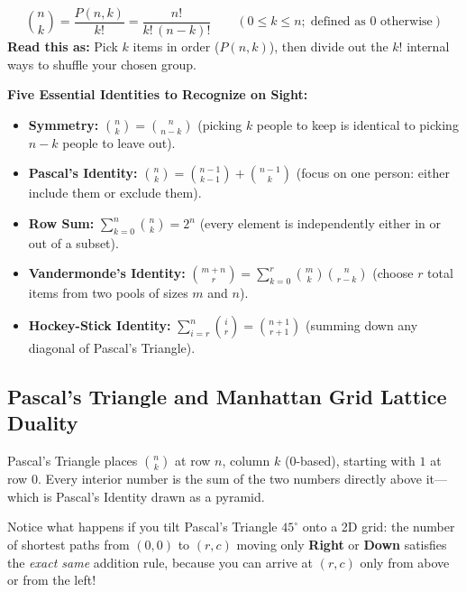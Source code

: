 \documentclass[11pt,a4paper]{article}
\theoremstyle{definition}
\begin{document}
\begin{formulabox}
\[
    \binom{n}{k} = \frac{P(n, k)}{k!} = \frac{n!}{k!\,(n - k)!}
    \qquad (0 \le k \le n;\; \text{defined as } 0 \text{ otherwise})
\]
\textbf{Read this as:} Pick $k$ items in order ($P(n, k)$), then divide out the $k!$ internal ways to shuffle your chosen group.
\end{formulabox}

\noindent\textbf{Five Essential Identities to Recognize on Sight:}
\begin{itemize}
    \item \textbf{Symmetry:} $\binom{n}{k} = \binom{n}{n-k}$ (picking $k$ people to keep is identical to picking $n - k$ people to leave out).
    \item \textbf{Pascal's Identity:} $\binom{n}{k} = \binom{n-1}{k-1} + \binom{n-1}{k}$ (focus on one person: either include them or exclude them).
    \item \textbf{Row Sum:} $\sum_{k=0}^{n} \binom{n}{k} = 2^n$ (every element is independently either in or out of a subset).
    \item \textbf{Vandermonde's Identity:} $\binom{m+n}{r} = \sum_{k=0}^{r} \binom{m}{k}\binom{n}{r-k}$ (choose $r$ total items from two pools of sizes $m$ and $n$).
    \item \textbf{Hockey-Stick Identity:} $\sum_{i=r}^{n} \binom{i}{r} = \binom{n+1}{r+1}$ (summing down any diagonal of Pascal's Triangle).
\end{itemize}

\subsection{Pascal's Triangle and Manhattan Grid Lattice Duality}

Pascal's Triangle places $\binom{n}{k}$ at row $n$, column $k$ ($0$-based), starting with $1$ at row $0$. Every interior number is the sum of the two numbers directly above it---which is Pascal's Identity drawn as a pyramid.

Notice what happens if you tilt Pascal's Triangle $45^\circ$ onto a 2D grid: the number of shortest paths from $(0,0)$ to $(r, c)$ moving only \textbf{Right} or \textbf{Down} satisfies the \emph{exact same} addition rule, because you can arrive at $(r, c)$ only from above or from the left!
\end{document}
